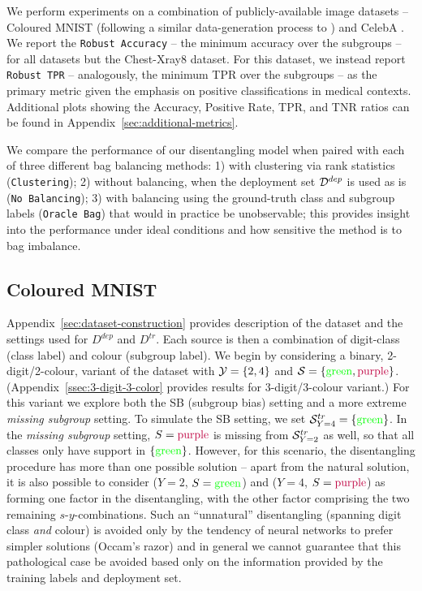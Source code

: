 We perform experiments on a combination of publicly-available image datasets -- Coloured MNIST
(following a similar data-generation process to \citet{KehBarThoQua20}) and CelebA
\citep{liu2015celeba}.
%
We report the \texttt{Robust Accuracy} -- the minimum accuracy over the subgroups -- for all
datasets but the Chest-Xray8 dataset. 
%
For this dataset, we instead report \texttt{Robust TPR} -- analogously, the minimum TPR over the
subgroups -- as the primary metric given the emphasis on positive classifications in medical
contexts. 
%
Additional plots showing the Accuracy, Positive Rate, TPR, and TNR ratios can be found in
Appendix~\ref{sec:additional-metrics}.

We compare the performance of our disentangling model when paired with each of three different bag
balancing methods: 1) with clustering via rank statistics (\texttt{Clustering}); 2) without
balancing, when the deployment set ${\mathcal{D}}^{dep}$ is used as is (\texttt{No Balancing}); 3) with
balancing using the ground-truth class and subgroup labels (\texttt{Oracle Bag}) that would in
practice be unobservable; this provides insight into the performance under ideal conditions and how
sensitive the method is to bag imbalance.
 
\subsection{Coloured MNIST}\label{ssec:cmnist_exp}
%

%
Appendix~\ref{sec:dataset-construction} provides description of the dataset and the settings used
for \( D^{dep} \) and \( D^{tr} \). 
%
Each source is then a combination of digit-class (class label) and colour (subgroup label). 
%
We begin by considering a binary, 2-digit/2-colour, variant of the dataset with ${\mathcal{Y}} = \{2, 4\}$
and ${\mathcal{S}} = \{\text{\color{green}green}, \text{\color{purple}purple}\}$.
(Appendix~\ref{ssec:3-digit-3-color} provides results for 3-digit/3-colour variant.) 
%
For this variant we explore both the SB (subgroup bias) setting and a more extreme \emph{missing
subgroup} setting.
%
To simulate the SB setting, we set \({\mathcal{S}}^{tr}_{ Y=4 }=\{\text{\color{green}{green}}\}\). 
%
In the \emph{missing subgroup} setting, $S=\text{\color{purple}{purple}}$ is missing from
\({\mathcal{S}}^{tr}_{ Y=2 }\) as well, so that all classes only have support in
\(\{\text{\color{green}{green}}\}\).
%
However, for this scenario, the disentangling procedure has more than one possible solution --
apart from the natural solution, it is also possible to consider ($Y=2$,
$S=\text{\color{green}{green}}$) and ($Y=4$, $S=\text{\color{purple}{purple}}$) as forming one
factor in the disentangling, with the other factor comprising the two remaining
$s$-$y$-combinations.
%
Such an ``unnatural'' disentangling (spanning digit class \emph{and} colour) is avoided only by the
tendency of neural networks to prefer simpler solutions (Occam's razor) and in general we cannot
guarantee that this pathological case be avoided based only on the information provided by the
training labels and deployment set.

